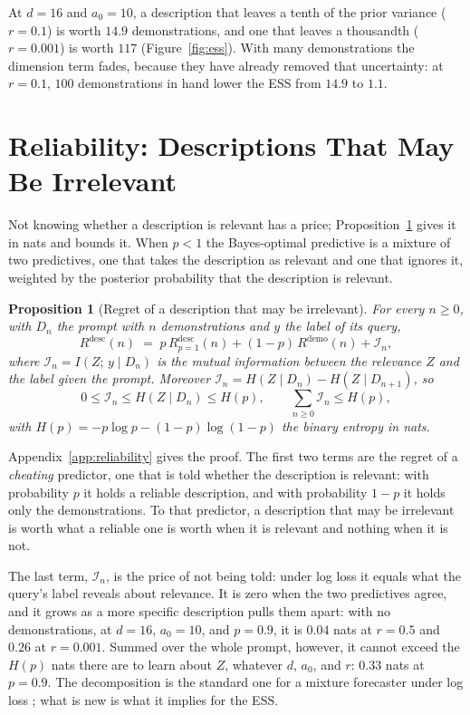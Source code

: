 \documentclass{article}
\newtheorem{proposition}[theorem]{Proposition}
\begin{document}
At $d = 16$ and $a_0 = 10$, a description that leaves a tenth of the prior variance ($r = 0.1$) is worth $14.9$ demonstrations, and one that leaves a thousandth ($r = 0.001$) is worth $117$ (Figure~\ref{fig:ess}). With many demonstrations the dimension term fades, because they have already removed that uncertainty: at $r = 0.1$, $100$ demonstrations in hand lower the ESS from $14.9$ to $1.1$.

\section{Reliability: Descriptions That May Be Irrelevant}\label{sec:reliability}
Not knowing whether a description is relevant has a price; Proposition~\ref{prop:unreliable} gives it in nats and bounds it. When $p < 1$ the Bayes-optimal predictive is a mixture of two predictives, one that takes the description as relevant and one that ignores it, weighted by the posterior probability that the description is relevant.

\begin{proposition}[Regret of a description that may be irrelevant]\label{prop:unreliable}
For every $n \ge 0$, with $D_n$ the prompt with $n$ demonstrations and $y$ the label of its query,
\begin{equation}\label{eq:decomp}
    R^{\mathrm{desc}}(n) \;=\; p\, R^{\mathrm{desc}}_{p=1}(n) + (1-p)\, R^{\mathrm{demo}}(n) + \mathcal{I}_n,
\end{equation}
where $\mathcal{I}_n = I(Z;\, y \mid D_n)$ is the mutual information between the relevance $Z$ and the label given the prompt. Moreover $\mathcal{I}_n = H(Z \mid D_n) - H(Z \mid D_{n+1})$, so
\[ 0 \le \mathcal{I}_n \le H(Z \mid D_n) \le H(p), \qquad \textstyle\sum_{n \ge 0} \mathcal{I}_n \le H(p), \]
with $H(p) = -p\log p - (1-p)\log(1-p)$ the binary entropy in nats.
\end{proposition}
Appendix~\ref{app:reliability} gives the proof. The first two terms are the regret of a \emph{cheating} predictor, one that is told whether the description is relevant: with probability $p$ it holds a reliable description, and with probability $1-p$ it holds only the demonstrations. To that predictor, a description that may be irrelevant is worth what a reliable one is worth when it is relevant and nothing when it is not.

The last term, $\mathcal{I}_n$, is the price of not being told: under log loss it equals what the query's label reveals about relevance. It is zero when the two predictives agree, and it grows as a more specific description pulls them apart: with no demonstrations, at $d = 16$, $a_0 = 10$, and $p = 0.9$, it is $0.04$ nats at $r = 0.5$ and $0.26$ at $r = 0.001$. Summed over the whole prompt, however, it cannot exceed the $H(p)$ nats there are to learn about $Z$, whatever $d$, $a_0$, and $r$: $0.33$ nats at $p = 0.9$. The decomposition is the standard one for a mixture forecaster under log loss \citep{cesabianchi2006, merhav1998}; what is new is what it implies for the ESS.
\end{document}

